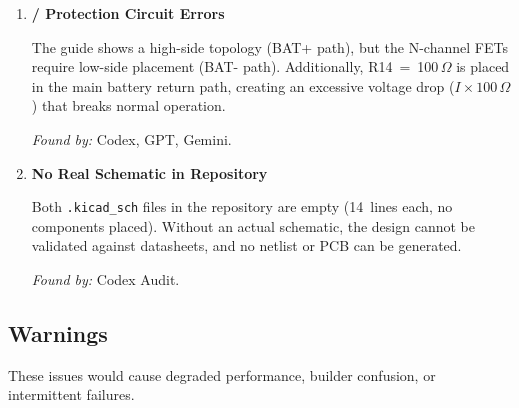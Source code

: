 \begin{enumerate}[leftmargin=2em, itemsep=8pt]
  \textit{Found by:} Codex Audit.

  \item \textbf{/ Protection Circuit Errors}

  The guide shows a high-side topology (BAT+ path), but the 
  N-channel FETs require low-side placement (BAT- path).  Additionally,
  R14~=~100\,$\Omega$ is placed in the main battery return path, creating an
  excessive voltage drop ($I \times 100\,\Omega$) that breaks normal operation.

  \textit{Found by:} Codex, GPT, Gemini.

  \item \textbf{No Real Schematic in Repository}

  Both \texttt{.kicad\_sch} files in the repository are empty (14~lines each,
  no components placed).  Without an actual schematic, the design cannot be
  validated against datasheets, and no netlist or PCB can be generated.

  \textit{Found by:} Codex Audit.

\end{enumerate}

\subsection{Warnings}

These issues would cause degraded performance, builder confusion, or
intermittent failures.

